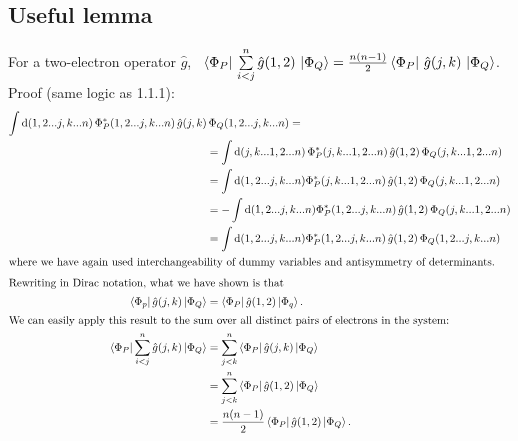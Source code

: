 \documentclass{article}
\newcommand{\vsp}{\vspace{0.2cm}}
\newcommand{\suml}{\sum\limits}
\begin{document}
\subsection{Useful lemma}
For a two-electron operator $\hat{g}$, \, $\Bra{\Phi_P} \, \suml^n_{i<j} \hat{g} (1,2) \, \Ket{\Phi_Q} = \frac{n(n-1)}{2} \Bra{\Phi_P} \,\hat{g} (j,k) \, \Ket{\Phi_Q}$. \\
Proof (same logic as 1.1.1): \vsp \\
\begin{align*}
\int \mathrm{d}(1,2 ... j,k ... n) \,  \Phi_P^* (1,2 ... j,k ... n) \, \hat{g} (j,k)& \, \Phi_Q (1,2 ... j,k ... n) = \\
&=  \int \mathrm{d}(j,k ... 1,2... n) \, \Phi_P^* (j,k ... 1,2... n) \, \hat{g} (1,2) \, \Phi_Q (j,k ... 1,2 ... n) \\
       &= \int \mathrm{d}(1,2 ... j,k ... n)  \Phi_P^* (j,k ... 1,2... n)\, \hat{g} (1,2) \, \Phi_Q (j,k ... 1,2 ... n) \\
       &= -\int \mathrm{d}(1,2 ... j,k ... n)  \Phi_P^* (1,2 ... j,k ... n)\, \hat{g} (1,2) \,\Phi_Q (j,k ... 1,2 ... n) \\
       &= \int \mathrm{d}(1,2 ... j,k ... n)  \Phi_P^* (1,2 ... j,k ... n)\, \hat{g} (1,2) \,\Phi_Q (1,2 ... j,k ... n) \\
\intertext{where we have again used interchangeability of dummy variables and antisymmetry of determinants.}
\intertext{Rewriting in Dirac notation, what we have shown is that} 
\Bra{\Phi_p} \hat{g} (j,k) \Ket{\Phi_Q}  &= \Bra{\Phi_P}  \hat{g} (1,2) \Ket{\Phi_q}.  \\
\intertext{We can easily apply this result to the sum over all distinct pairs of electrons in the system:}
\Bra{\Phi_P} \suml_{i<j}^n \hat{g} (j,k) \Ket{\Phi_Q}  &= \suml_{j<k}^n \Bra{\Phi_P}  \hat{g} (j,k) \Ket{\Phi_Q}  \\
									      &= \suml_{j<k}^n \Bra{\Phi_P}  \hat{g} (1,2) \Ket{\Phi_Q} \\
									       &= \frac{n(n-1)}{2} \Bra{\Phi_P}  \hat{g} (1,2) \Ket{\Phi_Q}.
\end{align*}

\newpage
\end{document}
